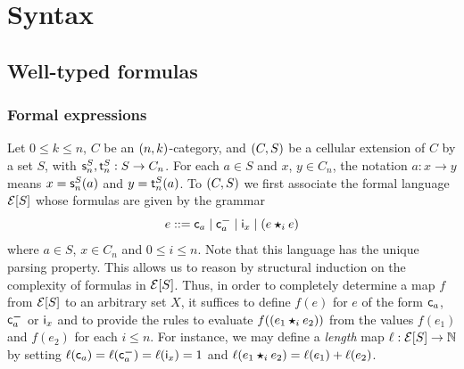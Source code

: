 \section{Syntax}\label{sec:syntax}

\subsection{Well-typed formulas}\label{subsec:wtform}

\subsubsection{Formal expressions}\label{ssubsec:formex}
Let $0\leq k\leq n$, $C$ be an $(n,k)$-category, and  $(C,S)$ be a
cellular extension of $C$ by a set $S$, with $\mathsf{s}_{n}^S,\mathsf{t}_{n}^S:S\to C_n$. For each $a\in S$ and $x$,
$y\in C_n$, the notation $a:x\to y$ means 
$x=\mathsf{s}_{n}^S(a)$ and $y=\mathsf{t}_{n}^S(a)$. To $(C,S)$ we first associate
the formal language $\mathcal{E}[S]$ whose formulas are given by the grammar
\[
  e ::= \mathsf{c}_{a} \mid \mathsf{c}^{\boldsymbol{-}}_{a} \mid \mathsf{i}_{x} \mid (e\bm{\star}_{i} e)
\]
where $a\in S$, $x\in C_n$ and $0\leq i\leq n$. Note that this
language has the unique parsing property. This allows us to reason by
structural induction on the complexity of formulas in $\mathcal{E}[S]$. Thus,
in order to completely determine a map $f$ from $\mathcal{E}[S]$ to an arbitrary
set $X$, it suffices to define $f(e)$ for $e$ of the form $\mathsf{c}_{a}$,
$\mathsf{c}^{\boldsymbol{-}}_{a}$ or $\mathsf{i}_{x}$ and to provide the rules to evaluate $f((e_1\bm{\star}_{i} e_2))$ from the values $f(e_1)$ and $f(e_2)$ for each $i\leq n$.
For instance, we may define a {\em length} map $\ell:\mathcal{E}[S]\to \mathbb N$
by setting $\ell(\mathsf{c}_{a})=\ell(\mathsf{c}^{\boldsymbol{-}}_{a})= \ell(\mathsf{i}_{x})=1$ and $\ell
(e_1\bm{\star}_{i} e_2)=\ell(e_1)+\ell(e_2)$. 



